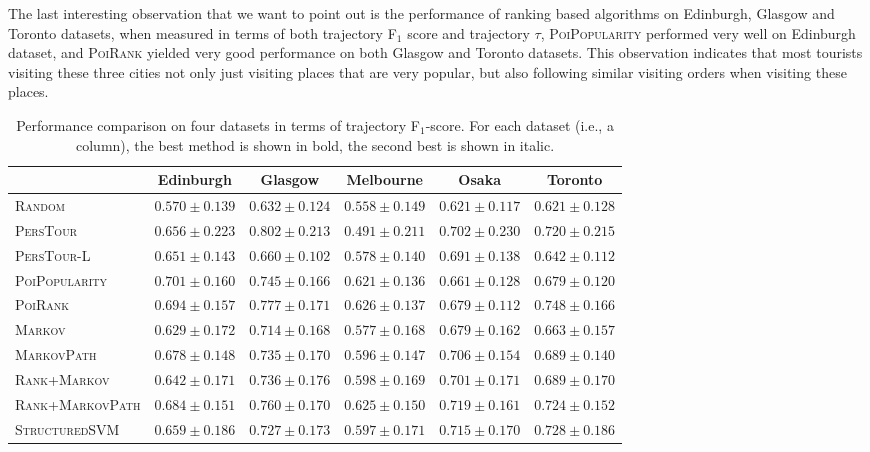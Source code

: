%
The last interesting observation that we want to point out is the performance of ranking based algorithms
on Edinburgh, Glasgow and Toronto datasets, when measured in terms of both trajectory F$_1$ score and trajectory
$\tau$, \textsc{PoiPopularity} performed very well on Edinburgh dataset, and \textsc{PoiRank} yielded very good
performance on both Glasgow and Toronto datasets.
This observation indicates that most tourists visiting these three cities not only just visiting
places that are very popular, but also following similar visiting orders when visiting these places.


\begin{table*}
\centering
\begin{tabular}{l|ccccc} \hline
 & Edinburgh & Glasgow & Melbourne & Osaka & Toronto \\ \hline
\textsc{Random} & $0.570\pm0.139$ & $0.632\pm0.124$ & $0.558\pm0.149$ & $0.621\pm0.117$ & $0.621\pm0.128$ \\
\textsc{PersTour}\cite{ijcai15} & $0.656\pm0.223$ & $\mathbf{0.802\pm0.213}$ & $0.491\pm0.211$ & $0.702\pm0.230$ & $0.720\pm0.215$ \\
\textsc{PersTour-L} & $0.651\pm0.143$ & $0.660\pm0.102$ & $0.578\pm0.140$ & $0.691\pm0.138$ & $0.642\pm0.112$ \\
\textsc{PoiPopularity} & $\mathbf{0.701\pm0.160}$ & $0.745\pm0.166$ & $0.621\pm0.136$ & $0.661\pm0.128$ & $0.679\pm0.120$ \\
\textsc{PoiRank} & $\mathit{0.694\pm0.157}$ & $\mathit{0.777\pm0.171}$ & $\mathbf{0.626\pm0.137}$ & $0.679\pm0.112$ & $\mathbf{0.748\pm0.166}$ \\
\textsc{Markov} & $0.629\pm0.172$ & $0.714\pm0.168$ & $0.577\pm0.168$ & $0.679\pm0.162$ & $0.663\pm0.157$ \\
\textsc{MarkovPath} & $0.678\pm0.148$ & $0.735\pm0.170$ & $0.596\pm0.147$ & $0.706\pm0.154$ & $0.689\pm0.140$ \\
\textsc{Rank+Markov} & $0.642\pm0.171$ & $0.736\pm0.176$ & $0.598\pm0.169$ & $0.701\pm0.171$ & $0.689\pm0.170$ \\
\textsc{Rank+MarkovPath} & $0.684\pm0.151$ & $0.760\pm0.170$ & $\mathit{0.625\pm0.150}$ & $\mathbf{0.719\pm0.161}$ & $0.724\pm0.152$ \\
\textsc{StructuredSVM} & $0.659\pm0.186$ & $0.727\pm0.173$ & $0.597\pm0.171$ & $\mathit{0.715\pm0.170}$ & $\mathit{0.728\pm0.186}$ \\
\hline
\end{tabular}
\caption{Performance comparison on four datasets in terms of trajectory F$_1$-score.
         For each dataset (i.e., a column), the best method is shown in bold, the second best is shown in italic.}
\label{table:f1}
\end{table*}


